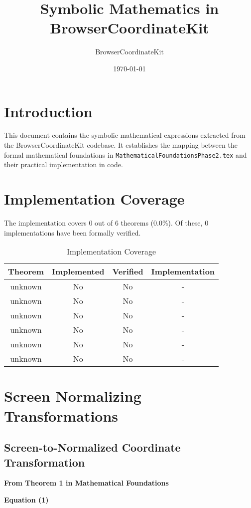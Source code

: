 \documentclass{article}
\title{Symbolic Mathematics in BrowserCoordinateKit}
\author{BrowserCoordinateKit}
\date{\today}
\begin{document}
\maketitle

\section{Introduction}

This document contains the symbolic mathematical expressions extracted from the BrowserCoordinateKit codebase.
It establishes the mapping between the formal mathematical foundations in \texttt{MathematicalFoundationsPhase2.tex}
and their practical implementation in code.

\section{Implementation Coverage}

The implementation covers 0 out of 6 theorems 
(0.0\%). 
Of these, 0 implementations have been formally verified.

\begin{table}[H]
\centering
\begin{tabular}{|c|c|c|c|}
\hline
\textbf{Theorem} & \textbf{Implemented} & \textbf{Verified} & \textbf{Implementation} \\
\hline
unknown & No & No & - \\
unknown & No & No & - \\
unknown & No & No & - \\
unknown & No & No & - \\
unknown & No & No & - \\
unknown & No & No & - \\
\hline
\end{tabular}
\caption{Implementation Coverage}
\end{table}

\section{Screen Normalizing Transformations}

\subsection{Screen-to-Normalized Coordinate Transformation}

\textbf{From Theorem 1 in Mathematical Foundations}

\textbf{Equation (1)}
\end{document}
